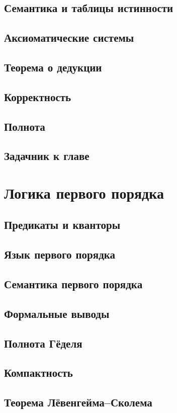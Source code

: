 \documentclass[12pt,a4paper,oneside,openany]{book}
\theoremstyle{definition}
\theoremstyle{plain}
\theoremstyle{remark}
\begin{document}
\section{Семантика и таблицы истинности}
\section{Аксиоматические системы}
\section{Теорема о дедукции}
\section{Корректность}
\section{Полнота}

\section{Задачник к главе}

\chapter{Логика первого порядка}

\section{Предикаты и кванторы}
\section{Язык первого порядка}
\section{Семантика первого порядка}
\section{Формальные выводы}
\section{Полнота Гёделя}
\section{Компактность}
\section{Теорема Лёвенгейма--Сколема}
\end{document}
